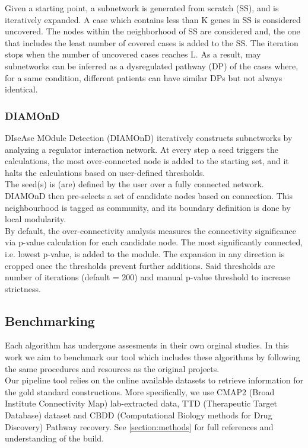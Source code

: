 Given a starting point, a subnetwork is generated from scratch (SS), and is iteratively expanded. A case which contains less than K genes in SS is considered uncovered. The nodes within the neighborhood of SS are considered and, the one that includes the least number of covered cases is added to the SS. The iteration stops when the number of uncovered cases reaches L. As a result, may subnetworks can be inferred as a dysregulated pathway (DP) of the cases where, for a same condition, different patients can have similar DPs but not always identical.

\subsubsection{DIAMOnD}
DIseAse MOdule Detection (DIAMOnD) \cite{Ghiassian2015AInteractome} iteratively constructs subnetworks by analyzing a regulator interaction network. At every step a seed triggers the calculations, the most over-connected node is added to the starting set, and it halts the calculations based on user-defined thresholds.
\\

The seed(s) is (are) defined by the user over a fully connected network. DIAMOnD then pre-selects a set of candidate nodes based on connection. This neighbourhood is tagged as community, and its boundary definition is done by local modularity.
\\

By default, the over-connectivity analysis measures the connectivity significance via p-value calculation for each candidate node. The most significantly connected, i.e. lowest p-value, is added to the module. The expansion in any direction is cropped once the thresholds prevent further additions. Said thresholds are number of iterations (default = 200) and manual p-value threshold to increase strictness.

\subsection{Benchmarking}
Each algorithm has undergone assesments in their own orginal studies. In this work we aim to benchmark our tool which includes these algorithms by following the same procedures and resources as the original projects. 
\\

Our pipeline tool relies on the online available datasets to retrieve information for the gold standard constructions. More specifically, we use CMAP2 (Broad Institute Connectivity Map) lab-extracted data, TTD (Therapeutic Target Database) dataset and CBDD (Computational Biology methods for Drug Discovery) Pathway recovery. See \ref{section:methods} for full references and understanding of the build.
\\

